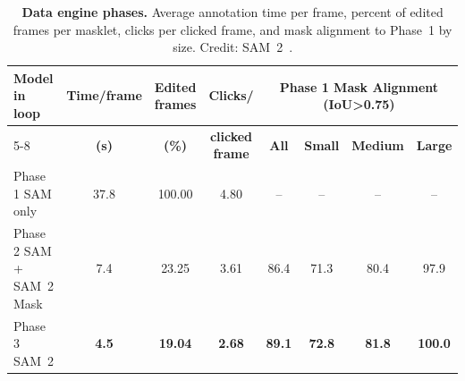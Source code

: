 \begin{enrichment}
\begin{enrichment}
		\begin{table}[H]
			\centering
			\scriptsize
			\caption{\textbf{Data engine phases.} Average annotation time per frame, percent of edited frames per masklet, clicks per clicked frame, and mask alignment to Phase~1 by size. Credit: SAM~2~\cite{ravi2024_sam2}.}
			\label{tab:chapter15_sam2_dataengine} 
			\begin{tabular}{lccccccc}
				\toprule
				\textbf{Model in loop} & \textbf{Time/frame} & \textbf{Edited frames} & \textbf{Clicks/} & \multicolumn{4}{c}{\textbf{Phase 1 Mask Alignment (IoU>0.75)}} \\
				\cmidrule(lr){5-8}
				& \textbf{(s)} & \textbf{(\%)} & \textbf{clicked frame} & \textbf{All} & \textbf{Small} & \textbf{Medium} & \textbf{Large} \\
				\midrule
				Phase 1 SAM only         & 37.8 & 100.00 & 4.80 & --   & --   & --   & --   \\
				Phase 2 SAM + SAM~2 Mask & 7.4  & 23.25  & 3.61 & 86.4 & 71.3 & 80.4 & 97.9 \\
				Phase 3 SAM~2            & \textbf{4.5} & \textbf{19.04} & \textbf{2.68} & \textbf{89.1} & \textbf{72.8} & \textbf{81.8} & \textbf{100.0} \\
				\bottomrule
			\end{tabular}
		\end{table}
		

\end{enrichment}
\end{enrichment}
